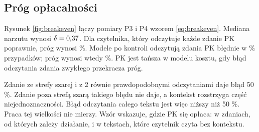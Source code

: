 \subsection{Próg opłacalności}
\label{sec:breakeven}

Rysunek \ref{fig:breakeven} łączy pomiary P3 i P4 wzorem \eqref{eq:breakeven}. Mediana
narzutu wynosi $\delta=\text{0,37}$. Dla czytelnika, który odczytuje każde
zdanie PK poprawnie, próg wynosi \pkTokBreakEven{} \%. Modele po kontroli odczytują zdania
PK błędnie w \pkErrPk{} \% przypadków; próg wynosi wtedy \pkBreakEvenStar{} \%. PK jest
tańsza w modelu kosztu, gdy błąd odczytania zdania zwykłego przekracza próg.

Zdanie ze strefy szarej i z 2 równie prawdopodobnymi odczytaniami daje błąd 50 \%.
Zdanie poza strefą szarą takiego błędu nie daje, a kontekst rozstrzyga część
niejednoznaczności. Błąd odczytania całego tekstu jest więc niższy niż 50 \%. Praca tej
wielkości nie mierzy. Wzór wskazuje, gdzie PK się opłaca: w zdaniach, od których zależy
działanie, i w tekstach, które czytelnik czyta bez kontekstu.

